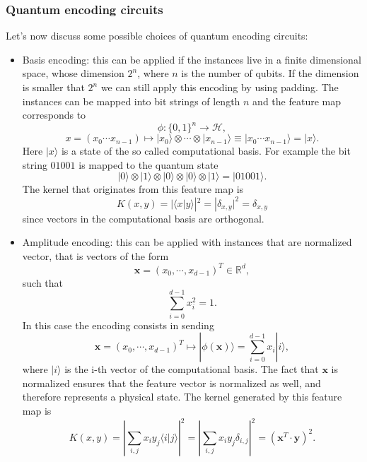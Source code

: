 \documentclass[12pt]{article}
\begin{document}
\subsubsection{Quantum encoding circuits}
Let's now discuss some possible choices of quantum encoding circuits:
\begin{itemize}
    \item Basis encoding: this can be applied if the instances live in a finite dimensional space, whose dimension $2^n$, where $n$ is the number of qubits. If the dimension is smaller that $2^n$ we can still apply this encoding by using padding. The instances can be mapped into bit strings of length $n$ and the feature map corresponds to
    \begin{equation}
        \phi:\{0,1\}^n \rightarrow \mathcal{H},
    \end{equation}
    $$x=(x_0\cdots x_{n-1})\mapsto |x_0\rangle \otimes \cdots \otimes |x_{n-1}\rangle\equiv|x_0\cdots x_{n-1}\rangle=|x\rangle.$$ Here $|x\rangle$ is a state of the so called computational basis. For example the bit string $01001$ is mapped to the quantum state $$|0\rangle \otimes |1\rangle \otimes |0\rangle \otimes |0\rangle \otimes |1\rangle=|01001\rangle.$$ The kernel that originates from this feature map is 
    \begin{equation}
        K(x,y)=|\langle x|y\rangle|^2=|\delta_{x,y}|^2=\delta_{x,y}
    \end{equation}
    since vectors in the computational basis are orthogonal. 
    \item Amplitude encoding: this can be applied with instances that are normalized vector, that is vectors of the form 
    \begin{equation}
        \mathbf{x}=(x_0, \cdots, x_{d-1})^T\in \mathbb{R}^d,
    \end{equation}
    such that $$\sum_{i=0}^{d-1}x_i^2=1.$$
    In this case the encoding consists in sending
    \begin{equation}
        \mathbf{x}=(x_0, \cdots, x_{d-1})^T \mapsto |\phi(\mathbf{x})\rangle=\sum_{i=0}^{d-1}x_i|i\rangle,
    \end{equation}
    where $|i\rangle$ is the i-th vector of the computational basis. The fact that $\mathbf{x}$ is normalized ensures that the feature vector is normalized as well, and therefore represents a physical state. The kernel generated by this feature map is 
    \begin{equation}
        K(x,y)=\left|\sum_{i,j}x_iy_j\langle i|j\rangle\right|^2=\left|\sum_{i,j}x_iy_j\delta_{i,j}\right|^2=(\mathbf{x}^T \cdot \mathbf{y})^2.

\end{equation}
\end{itemize}
\end{document}
